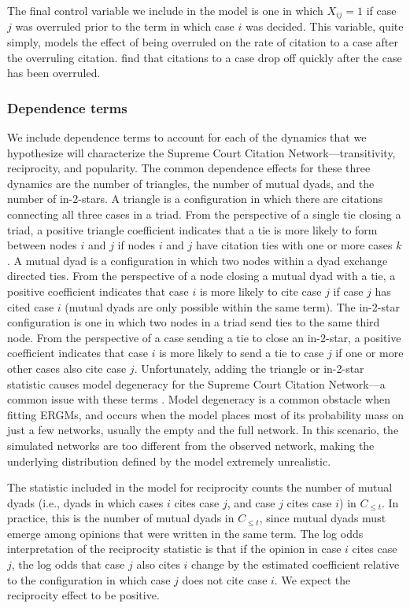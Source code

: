 \documentclass{cup-pan}
\begin{document}
The final control variable we include in the model is one in which $X_{ij} = 1$ if case $j$ was overruled prior to the term in which case $i$ was decided. This variable, quite simply, models the effect of being overruled on the rate of citation to a case after the overruling citation. \citet{fowler2008authority} find that citations to a case drop off quickly after the case has been overruled.


\subsubsection{Dependence terms}\label{dependence_terms}

We include dependence terms to account for each of the dynamics that we hypothesize will characterize the Supreme Court Citation Network---transitivity, reciprocity, and popularity.  The common dependence effects for these three dynamics are the number of triangles, the number of mutual dyads, and the number of in-2-stars. A triangle is a configuration in which there are citations connecting all three cases in a triad. From the perspective of a single tie closing a triad, a positive triangle coefficient indicates that a tie is more likely to form between nodes $i$ and $j$ if nodes $i$ and $j$ have citation ties with one or more cases $k$. A mutual dyad is a configuration in which two nodes within a dyad exchange directed ties. From the perspective of a node closing a mutual dyad with a tie, a positive coefficient indicates that case $i$ is more likely to cite case $j$ if case $j$ has cited case $i$ (mutual dyads are only possible within the same term). The in-2-star configuration is one in which two nodes in a triad send ties to the same third node. From the perspective of a case sending a tie to close an in-2-star, a positive coefficient indicates that case $i$ is more likely to send a tie to case $j$ if one or more other cases also cite case $j$. Unfortunately, adding the triangle or in-2-star statistic causes model degeneracy for the Supreme Court Citation Network---a common issue with these terms \citep{Handcock.2003}. Model degeneracy is a common obstacle when fitting ERGMs, and occurs when the model places most of its probability mass on just a few networks, usually the empty and the full network. In this scenario, the simulated networks are too different from the observed network, making the underlying distribution defined by the model extremely unrealistic.

The statistic included in the model for reciprocity counts the number of mutual dyads (i.e., dyads in which cases $i$ cites case $j$, and case $j$ cites case $i$) in $C_{\leq t}$. In practice, this is the number of mutual dyads in $C_{\leq t}$, since mutual dyads must emerge among opinions that were written in the same term. The log odds interpretation of the reciprocity statistic is that if the opinion in case $i$ cites case $j$, the log odds that case $j$ also cites $i$ change by the estimated coefficient relative to the configuration in which case $j$ does not cite case $i$. We expect the reciprocity effect to be positive.
\end{document}
